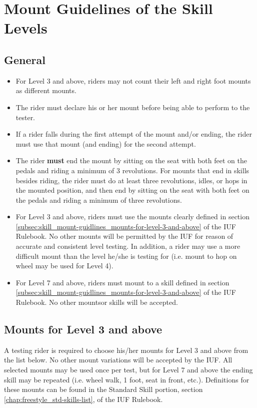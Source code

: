 \section{Mount Guidelines of the Skill Levels}

\subsection{General}
\begin{itemize}
\item For Level 3 and above, riders may not count their left and right foot mounts as different mounts.
\item The rider must declare his or her mount before being able to perform to the tester.
\item If a rider falls during the first attempt of the mount and/or ending, the rider must use that mount (and ending) for the second attempt.
\item The rider \textbf{must} end the mount by sitting on the seat with both feet on the pedals and riding a minimum of 3 revolutions.
For mounts that end in skills besides riding, the rider must do at least three revolutions, idles, or hops in the mounted position, and then end by sitting on the seat with both feet on the pedals and riding a minimum of three revolutions.
\item For Level 3 and above, riders must use the mounts clearly defined in section \ref{subsec:skill_mount-guidlines_mounts-for-level-3-and-above} of the IUF Rulebook.
No other mounts will be permitted by the IUF for reason of accurate and consistent level testing.
In addition, a rider may use a more difficult mount than the level he/she is testing for (i.e.
mount to hop on wheel may be used for Level 4).
\item For Level 7 and above, riders must mount to a skill defined in section \ref{subsec:skill_mount-guidlines_mounts-for-level-3-and-above} of the IUF Rulebook.
No other mountsor skills will be accepted.
\end{itemize}


\subsection{Mounts for Level 3 and above \label{subsec:skill_mount-guidlines_mounts-for-level-3-and-above}}
A testing rider is required to choose his/her mounts for Level 3 and above from the list below.
No other mount variations will be accepted by the IUF.
All selected mounts may be used once per test, but for Level 7 and above the ending skill may be repeated (i.e. wheel walk, 1 foot, seat in front, etc.).
Definitions for these mounts can be found in the Standard Skill portion, section \ref{chap:freestyle_std-skills-list}, of the IUF Rulebook.

